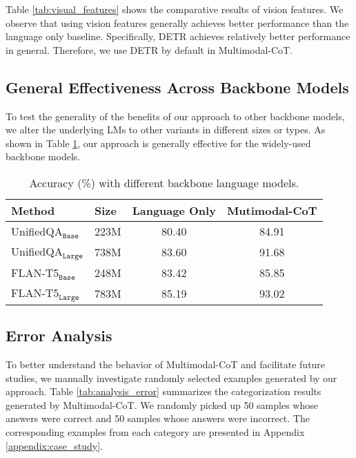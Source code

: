 \documentclass[nohyperref]{article}
\theoremstyle{plain}
\theoremstyle{definition}
\theoremstyle{remark}
\begin{document}
Table \ref{tab:visual_features} shows the comparative results of vision features. We observe that using vision features generally achieves better performance than the language only baseline. Specifically, DETR achieves {relatively better} performance in general. Therefore, we use DETR by default in Multimodal-CoT.

\subsection{General Effectiveness Across Backbone Models}\label{sec:backbones}
To test the generality of the benefits of our approach to other backbone models, we alter the underlying LMs to other variants in different sizes or types. As shown in Table \ref{tab:backbone}, our approach is generally effective for the widely-used backbone models.


\begin{table}[htb]
\vspace{-2mm}
    \centering\small
        \caption{Accuracy (\%) with different backbone language models. \label{tab:backbone}}
   \setlength{\tabcolsep}{2.5pt}
\begin{tabular}{llcc}\toprule
 {Method} & {Size} & {Language Only} & {Mutimodal-CoT} \\\midrule
 UnifiedQA$_\texttt{Base}$ & 223M & 80.40 & 84.91  \\
 UnifiedQA$_\texttt{Large}$ & 738M & 83.60 & 91.68\\
 \midrule
 FLAN-T5$_\texttt{Base}$ & 248M &83.42  & 85.85  \\
 FLAN-T5$_\texttt{Large}$ & 783M & 85.19& 93.02 \\
\bottomrule
\end{tabular}
\vspace{-3.6mm}
\end{table}



\subsection{Error Analysis}\label{sec:case_studies}

To better understand the behavior of Multimodal-CoT and facilitate future studies, we manually investigate randomly selected examples generated by our approach. Table \ref{tab:analysis_error} summarizes the categorization results generated by Multimodal-CoT. We randomly picked up 50 samples whose answers were correct and 50 samples whose answers were incorrect. The corresponding examples from each category are presented in Appendix \ref{appendix:case_study}.
\end{document}
